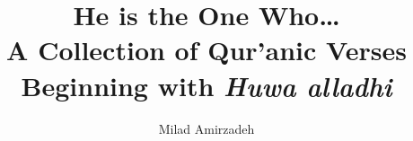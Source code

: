 \documentclass[a4paper,12pt,openany]{book}
\title{He is the One Who\ldots \\ \large A Collection of Qur'anic Verses Beginning with \textit{Huwa alladhi}}
\author{Milad Amirzadeh}
\begin{document}
\maketitle
\tableofcontents































\clearpage
\theendnotes
\end{document}
